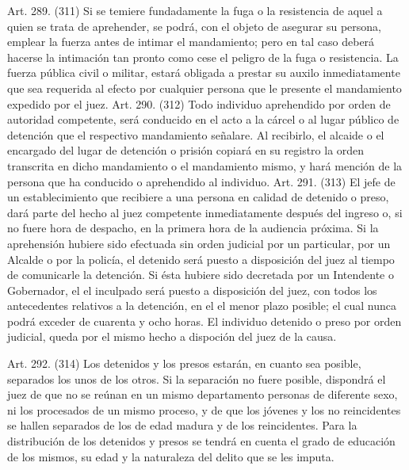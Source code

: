     Art. 289. (311) Si se temiere fundadamente la fuga o la resistencia de aquel a quien se trata de aprehender, se podrá, con el objeto de asegurar su persona, emplear la fuerza antes de intimar el mandamiento; pero en tal caso deberá hacerse la intimación tan pronto como cese el peligro de la fuga o resistencia.
    La fuerza pública civil o militar, estará obligada a prestar su auxilo inmediatamente que sea requerida al efecto por cualquier persona que le presente el mandamiento expedido por el juez.
    Art. 290. (312) Todo individuo aprehendido por orden de autoridad competente, será conducido en el acto a la cárcel o al lugar público de detención que el respectivo mandamiento señalare.
    Al recibirlo, el alcaide o el encargado del lugar de detención o prisión copiará en su registro la orden transcrita en dicho mandamiento o el mandamiento mismo, y hará mención de la persona que ha conducido o aprehendido al individuo.
    Art. 291. (313) El jefe de un establecimiento que recibiere a una persona en calidad de detenido o preso, dará parte del hecho al juez competente inmediatamente después del ingreso o, si no fuere hora de despacho, en la primera hora de la audiencia próxima.
    Si la aprehensión hubiere sido efectuada sin orden judicial por un particular, por un Alcalde o por la policía, el detenido será puesto a disposición del juez al tiempo de comunicarle la detención. Si ésta hubiere sido decretada por un Intendente o Gobernador, el el inculpado será puesto a disposición del juez, con todos los antecedentes relativos a la detención, en el el menor plazo posible; el cual nunca podrá exceder de cuarenta y ocho horas.
    El individuo detenido o preso por orden judicial, queda por el mismo hecho a dispoción del juez de la causa.

    Art. 292. (314) Los detenidos y los presos estarán, en cuanto sea posible, separados los unos de los otros.
    Si la separación no fuere posible, dispondrá el juez de que no se reúnan en un mismo departamento personas de diferente sexo, ni los procesados de un mismo proceso, y de que los jóvenes y los no reincidentes se hallen separados de los de edad madura y de los reincidentes.
    Para la distribución de los detenidos y presos se tendrá en cuenta el grado de educación de los mismos, su edad y la naturaleza del delito que se les imputa.



